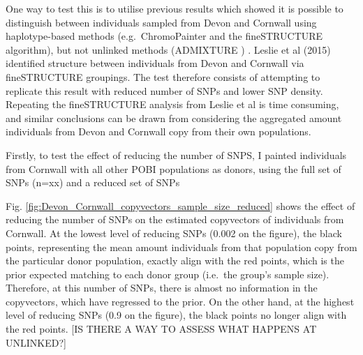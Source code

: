 One way to test this is to utilise previous results which showed it is possible to distinguish between individuals sampled from Devon and Cornwall using haplotype-based methods (e.g.\ ChromoPainter and the fineSTRUCTURE algorithm), but not unlinked methods (ADMIXTURE \cite{alexander2009fast}) \cite{Leslie2015}. Leslie et al (2015) identified structure between individuals from Devon and Cornwall via fineSTRUCTURE groupings. The test therefore consists of attempting to replicate this result with reduced number of SNPs and lower SNP density. Repeating the fineSTRUCTURE analysis from Leslie et al is time consuming, and similar conclusions can be drawn from considering the aggregated amount individuals from Devon and Cornwall copy from their own populations.

Firstly, to test the effect of reducing the number of SNPS, I painted individuals from Cornwall with all other POBI populations as donors, using the full set of SNPs (n=xx) and a reduced set of SNPs 

Fig. \ref{fig:Devon_Cornwall_copyvectors_sample_size_reduced} shows the effect of reducing the number of SNPs on the estimated copyvectors of individuals from Cornwall. At the lowest level of reducing SNPs (0.002 on the figure), the black points, representing the mean amount individuals from that population copy from the particular donor population, exactly align with the red points, which is the prior expected matching to each donor group (i.e.\ the group's sample size). Therefore, at this number of SNPs, there is almost no information in the copyvectors, which have regressed to the prior. On the other hand, at the highest level of reducing SNPs (0.9 on the figure), the black points no longer align with the red points. {\color{red}[IS THERE A WAY TO ASSESS WHAT HAPPENS AT UNLINKED?]}

